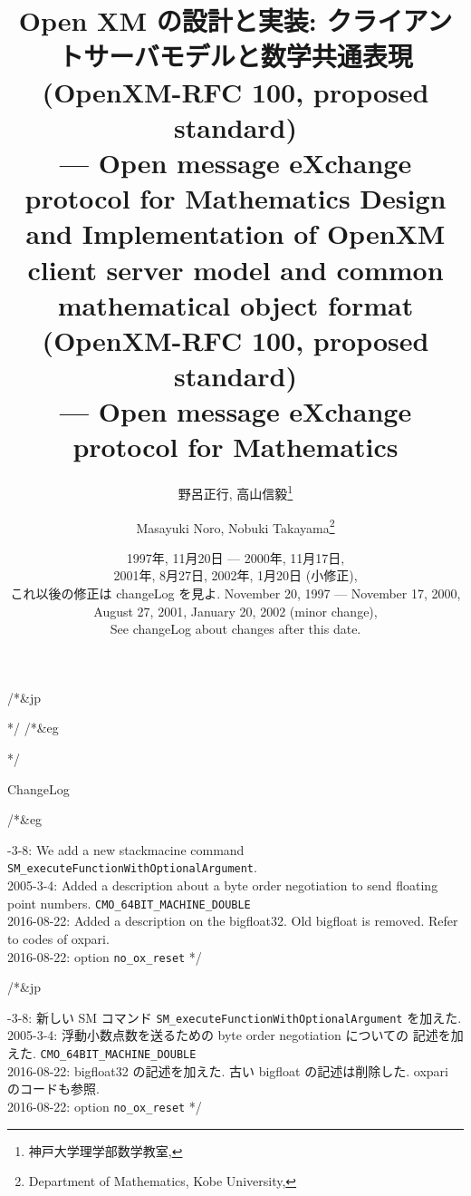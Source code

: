 \documentclass{article}
\begin{document}
/*&jp
\title{{\bf Open XM の設計と実装: クライアントサーバモデルと数学共通表現 (OpenXM-RFC 100, proposed standard)} \\
 --- Open message eXchange protocol for Mathematics }
\author{ 野呂正行, 
         高山信毅\thanks{神戸大学理学部数学教室,}}
\date{ 1997年, 11月20日 --- 2000年, 11月17日, \\
       2001年, 8月27日, 2002年, 1月20日 (小修正),\\
        これ以後の修正は changeLog を見よ.}
*/
/*&eg
\title{{\bf Design and Implementation of OpenXM client server model and
common mathematical object format (OpenXM-RFC 100, proposed standard)} \\
 --- Open message eXchange protocol for Mathematics 
}
\author{ Masayuki Noro, 
         Nobuki Takayama\thanks{Department of Mathematics, Kobe University,}}
\date{ November 20, 1997 --- November 17, 2000, \\
       August 27, 2001, January 20, 2002 (minor change), \\
       See changeLog about changes after this date.}
*/

\maketitle

\noindent ChangeLog

/*&eg  


-3-8: We add a new stackmacine command {\tt SM\_executeFunctionWithOptionalArgument}. \\
2005-3-4: Added a description about a byte order negotiation to send floating 
point numbers.  {\tt CMO\_64BIT\_MACHINE\_DOUBLE} \\
2016-08-22: Added a description on the bigfloat32. Old bigfloat is removed.
Refer to codes of oxpari. \\
2016-08-22: option {\tt no\_ox\_reset}
*/



/*&jp


-3-8: 新しい SM コマンド {\tt SM\_executeFunctionWithOptionalArgument} を加えた. \\
2005-3-4: 浮動小数点数を送るための byte order negotiation についての
 記述を加えた. {\tt CMO\_64BIT\_MACHINE\_DOUBLE} \\
2016-08-22: bigfloat32 の記述を加えた. 古い bigfloat の記述は削除した.
oxpari のコードも参照. \\
2016-08-22: option {\tt no\_ox\_reset}
*/
\end{document}
